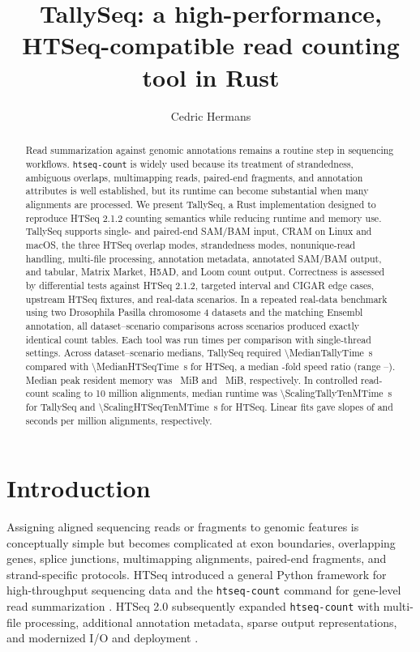 \documentclass[11pt]{article}
\title{TallySeq: a high-performance, HTSeq-compatible read counting tool in Rust}
\author[1]{Cedric Hermans}
\affil[1]{BIT\textsuperscript{2}lab, Howest University of Applied Sciences, Bruges, Belgium}
\date{}
\begin{document}
\maketitle

\begin{abstract}
Read summarization against genomic annotations remains a routine step in sequencing workflows. \texttt{htseq-count} is widely used because its treatment of strandedness, ambiguous overlaps, multimapping reads, paired-end fragments, and annotation attributes is well established, but its runtime can become substantial when many alignments are processed. We present TallySeq, a Rust implementation designed to reproduce HTSeq 2.1.2 counting semantics while reducing runtime and memory use. TallySeq supports single- and paired-end SAM/BAM input, CRAM on Linux and macOS, the three HTSeq overlap modes, strandedness modes, nonunique-read handling, multi-file processing, annotation metadata, annotated SAM/BAM output, and tabular, Matrix Market, H5AD, and Loom count output. Correctness is assessed by differential tests against HTSeq 2.1.2, targeted interval and CIGAR edge cases, upstream HTSeq fixtures, and real-data scenarios. In a repeated real-data benchmark using two Drosophila Pasilla chromosome 4 datasets and the matching Ensembl annotation, all \BenchmarkExactScenarioCount{} dataset--scenario comparisons across \BenchmarkScenarioCount{} scenarios produced exactly identical count tables. Each tool was run \BenchmarkRepeats{} times per comparison with single-thread settings. Across dataset--scenario medians, TallySeq required \SI{\MedianTallyTime}{\second} compared with \SI{\MedianHTSeqTime}{\second} for HTSeq, a median \MedianSpeedup{}-fold speed ratio (range \MinimumSpeedup{}--\MaximumSpeedup{}). Median peak resident memory was \MedianTallyRSS{}~MiB and \MedianHTSeqRSS{}~MiB, respectively. In controlled read-count scaling to 10 million alignments, median runtime was \SI{\ScalingTallyTenMTime}{\second} for TallySeq and \SI{\ScalingHTSeqTenMTime}{\second} for HTSeq. Linear fits gave slopes of \ScalingTallySlope{} and \ScalingHTSeqSlope{} seconds per million alignments, respectively.
\end{abstract}

\section{Introduction}

Assigning aligned sequencing reads or fragments to genomic features is conceptually simple but becomes complicated at exon boundaries, overlapping genes, splice junctions, multimapping alignments, paired-end fragments, and strand-specific protocols. HTSeq introduced a general Python framework for high-throughput sequencing data and the \texttt{htseq-count} command for gene-level read summarization \citep{Anders2015}. HTSeq 2.0 subsequently expanded \texttt{htseq-count} with multi-file processing, additional annotation metadata, sparse output representations, and modernized I/O and deployment \citep{Putri2022}.
\end{document}
